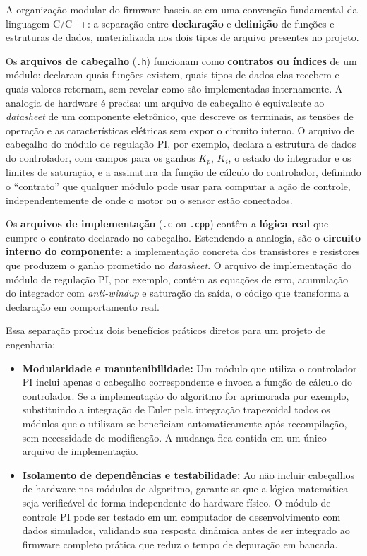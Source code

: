 A organização modular do firmware baseia-se em uma convenção fundamental da linguagem C/C++: a separação entre \textbf{declaração} e \textbf{definição} de funções e estruturas de dados, materializada nos dois tipos de arquivo presentes no projeto.

Os \textbf{arquivos de cabeçalho} (\texttt{.h}) funcionam como \textbf{contratos ou índices} de um módulo: declaram quais funções existem, quais tipos de dados elas recebem e quais valores retornam, sem revelar como são implementadas internamente. A analogia de hardware é precisa: um arquivo de cabeçalho é equivalente ao \textit{datasheet} de um componente eletrônico, que descreve os terminais, as tensões de operação e as características elétricas sem expor o circuito interno. O arquivo de cabeçalho do módulo de regulação PI, por exemplo, declara a estrutura de dados do controlador, com campos para os ganhos $K_p$, $K_i$, o estado do integrador e os limites de saturação, e a assinatura da função de cálculo do controlador, definindo o ``contrato'' que qualquer módulo pode usar para computar a ação de controle, independentemente de onde o motor ou o sensor estão conectados.

Os \textbf{arquivos de implementação} (\texttt{.c} ou \texttt{.cpp}) contêm a \textbf{lógica real} que cumpre o contrato declarado no cabeçalho. Estendendo a analogia, são o \textbf{circuito interno do componente}: a implementação concreta dos transistores e resistores que produzem o ganho prometido no \textit{datasheet}. O arquivo de implementação do módulo de regulação PI, por exemplo, contém as equações de erro, acumulação do integrador com \textit{anti-windup} e saturação da saída, o código que transforma a declaração em comportamento real.

Essa separação produz dois benefícios práticos diretos para um projeto de engenharia:

\begin{itemize}
    \item \textbf{Modularidade e manutenibilidade:} Um módulo que utiliza o controlador PI inclui apenas o cabeçalho correspondente e invoca a função de cálculo do controlador. Se a implementação do algoritmo for aprimorada por exemplo, substituindo a integração de Euler pela integração trapezoidal todos os módulos que o utilizam se beneficiam automaticamente após recompilação, sem necessidade de modificação. A mudança fica contida em um único arquivo de implementação.
    \item \textbf{Isolamento de dependências e testabilidade:} Ao não incluir cabeçalhos de hardware nos módulos de algoritmo, garante-se que a lógica matemática seja verificável de forma independente do hardware físico. O módulo de controle PI pode ser testado em um computador de desenvolvimento com dados simulados, validando sua resposta dinâmica antes de ser integrado ao firmware completo prática que reduz o tempo de depuração em bancada.
\end{itemize}

